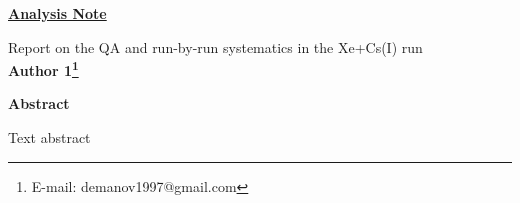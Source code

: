 \documentclass[14pt]{extarticle}
\begin{document}
    \begin{center} 
        \textbf{\Large \underline{Analysis Note}}
        
        \large{ Report on the QA and run-by-run systematics in the Xe+Cs(I) run }\\[.2cm] 
        
        \normalsize
        \textbf{ 
            Author 1\footnote{E-mail: demanov1997@gmail.com}
            } 
        \setcounter{footnote}{0}
        
         \noindent
            \underline{\hspace{17.5cm}}
            \begin{center}
                \textbf{Abstract} 
            \end{center}
            
                \small
               Text abstract  \cite{VoloshinZhang}
                
            
            \normalsize
            \noindent
    \end{center}

      
    \normalsize
    \noindent
    \underline{\hspace{17.6cm}}

    \tableofcontents
    
    
    
    


    \printbibliography
    
\end{document}
